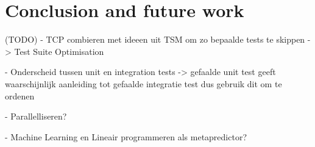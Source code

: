 \chapter{Conclusion and future work}

(TODO)
- TCP combieren met ideeen uit TSM om zo bepaalde tests te skippen -> Test Suite Optimisation

- Onderscheid tussen unit en integration tests -> gefaalde unit test geeft waarschijnlijk aanleiding tot gefaalde integratie test dus gebruik dit om te ordenen

- Parallelliseren?

- Machine Learning en Lineair programmeren als metapredictor?


